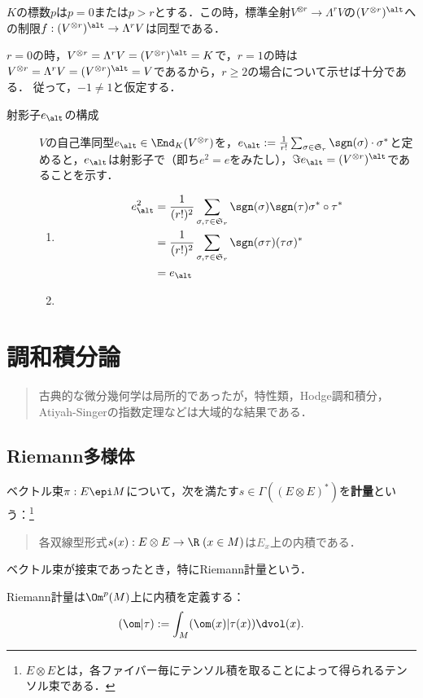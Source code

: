 \documentclass[uplatex,dvipdfmx]{jsreport}
\begin{document}
\begin{proposition}[alternizer]
    $K$の標数$p$は$p=0$または$p>r$とする．この時，標準全射$V^{\otimes r}\to\Lambda^rV$の$(V^{\otimes r})^\alt$への制限$f:(V^{\otimes r})^\alt\to\Lambda^rV$は同型である．
\end{proposition}
\begin{Proof}
    $r=0$の時，$V^{\otimes r}=\Lambda^rV=(V^{\otimes r})^\alt=K$で，$r=1$の時は$V^{\otimes r}=\Lambda^rV=(V^{\otimes r})^\alt=V$であるから，$r\ge 2$の場合について示せば十分である．
    従って，$-1\ne 1$と仮定する．
    \begin{description}
        \item[射影子$e_\alt$の構成] 
        $V$の自己準同型$e_\alt\in\End_K(V^{\otimes r})$を，$e_\alt:=\frac{1}{r!}\sum_{\sigma\in\mathfrak{S}_r}\sgn(\sigma)\cdot \sigma^*$と定めると，$e_{\alt}$は射影子で（即ち$e^2=e$をみたし），$\Im e_\alt=(V^{\otimes r})^\alt$であることを示す．
        \begin{enumerate}
            \item \begin{align*}
                e^2_\alt&=\frac{1}{(r!)^2}\sum_{\sigma,\tau\in\mathfrak{S}_r}\sgn(\sigma)\sgn(\tau)\sigma^*\circ\tau^*\\
                &=\frac{1}{(r!)^2}\sum_{\sigma,\tau\in\mathfrak{S}_r}\sgn(\sigma\tau)(\tau\sigma)^*\\
                &=e_\alt
            \end{align*}
            \item 
        \end{enumerate}
    \end{description}
\end{Proof}

\chapter{調和積分論}

\begin{quotation}
    古典的な微分幾何学は局所的であったが，特性類，Hodge調和積分，Atiyah-Singerの指数定理などは大域的な結果である．
\end{quotation}

\section{Riemann多様体}

\begin{definition}[metric]
    ベクトル束$\pi:E\epi M$について，次を満たす$s\in\Gamma((E\otimes E)^*)$を\textbf{計量}という：\footnote{$E\otimes E$とは，各ファイバー毎にテンソル積を取ることによって得られるテンソル束である．}
    \begin{quote}
        各双線型形式$s(x):E\otimes E\to\R\;(x\in M)$は$E_x$上の内積である．
    \end{quote}
    ベクトル束が接束であったとき，特にRiemann計量という．
\end{definition}
\begin{remarks}
    Riemann計量は$\Om^p(M)$上に内積を定義する：
    \[(\om|\tau):=\int_M(\om(x)|\tau(x))\dvol(x).\]
\end{remarks}
\end{document}
